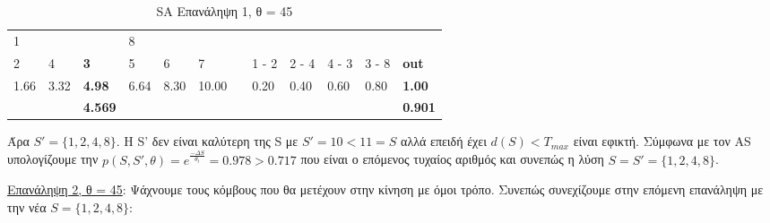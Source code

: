 \documentclass[12pt, a4paper]{article}
\begin{document}
\begin{table}[H]
\centering
\begin{tabular}{llllllllllll}
\multicolumn{1}{|l}{1}     & \textbf{}                 & \multicolumn{1}{l|}{}              & 8                         &                           &       &                                &                            &                            &                            &                            &                \\
\multicolumn{1}{|l|}{2}    & \multicolumn{1}{l|}{4}    & \multicolumn{1}{l|}{\textbf{3}}    & \multicolumn{1}{l|}{5}    & \multicolumn{1}{l|}{6}    & 7     & \multicolumn{1}{l|}{\textbf{}} & \multicolumn{1}{l|}{1 - 2} & \multicolumn{1}{l|}{2 - 4} & \multicolumn{1}{l|}{4 - 3} & \multicolumn{1}{l|}{3 - 8} & \textbf{out}   \\ \cline{1-6} \cline{8-12} 
\multicolumn{1}{|l|}{1.66} & \multicolumn{1}{l|}{3.32} & \multicolumn{1}{l|}{\textbf{4.98}} & \multicolumn{1}{l|}{6.64} & \multicolumn{1}{l|}{8.30} & 10.00 & \multicolumn{1}{l|}{\textbf{}} & \multicolumn{1}{l|}{0.20}  & \multicolumn{1}{l|}{0.40}  & \multicolumn{1}{l|}{0.60}  & \multicolumn{1}{l|}{0.80}  & \textbf{1.00}  \\
                           &                           & \textbf{4.569}                     &                           &                           &       & \textbf{}                      &                            &                            &                            &                            & \textbf{0.901}
\end{tabular}
\caption{SA Επανάληψη 1, θ = 45}
\label{my-label}
\end{table}

Άρα \(S'=\{1,2,4,8\}\). Η S' δεν είναι καλύτερη της S με \(S'=10<11=S\) αλλά επειδή έχει \(d(S) < T_{max}\) είναι εφικτή. Σύμφωνα με τον AS υπολογίζουμε την \(p(S,S',\theta) =  e^{\frac{-\Delta S}{\theta_t}} = 0.978 > 0.717\) που είναι ο επόμενος τυχαίος αριθμός και συνεπώς η λύση \(S = S' = \{1,2,4,8\}\).


\underline{Επανάληψη 2, θ = 45}: Ψάχνουμε τους κόμβους που θα μετέχουν στην κίνηση με όμοι τρόπο. Συνεπώς συνεχίζουμε στην επόμενη επανάληψη με την νέα \(S = \{1,2,4,8\}\):
\end{document}
